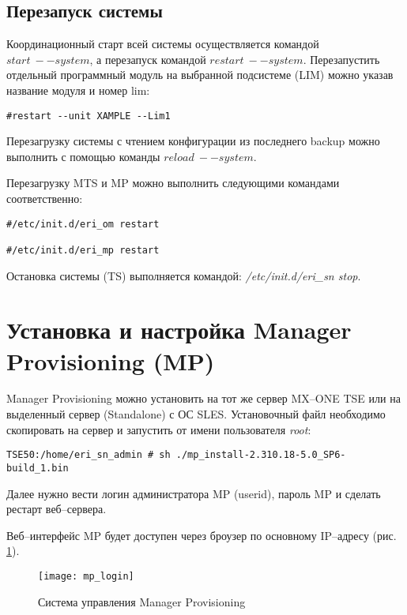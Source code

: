 \subsection{Перезапуск системы} \label{sec:restart}

Координационный старт всей системы осуществляется командой $start\ --system$, а перезапуск командой $restart\ --system$. Перезапустить отдельный программный модуль на выбранной подсистеме (LIM) можно указав название модуля и номер lim:
\begin{lstlisting}
#restart --unit XAMPLE --Lim1
\end{lstlisting}

Перезагрузку системы с чтением конфигурации из последнего backup можно выполнить с помощью команды $reload\ --system$.

Перезагрузку MTS и MP можно выполнить следующими командами соответственно:
\begin{lstlisting}
#/etc/init.d/eri_om restart

#/etc/init.d/eri_mp restart
\end{lstlisting}

Остановка системы (TS) выполняется командой: {\em /etc/init.d/eri\_sn stop}.


\section{Установка и настройка Manager Provisioning (MP)} \label{sec:mp}

Manager Provisioning можно установить на тот же сервер MX--ONE TSE или на выделенный сервер (Standalone) с ОС SLES. 
Установочный файл необходимо скопировать на сервер и запустить от имени пользователя {\em root}:
\begin{lstlisting}
TSE50:/home/eri_sn_admin # sh ./mp_install-2.310.18-5.0_SP6-build_1.bin
\end{lstlisting}

Далее нужно вести логин администратора MP (userid), пароль MP и сделать рестарт веб--сервера.

Веб--интерфейс MP будет доступен через броузер по основному IP--адресу (рис. \ref{img:mp_login}).

\begin{figure}[!ht]
  \center
  \texttt{[image: mp\_login]}
  \caption{Система управления Manager Provisioning}
  \label{img:mp_login}
\end{figure}

